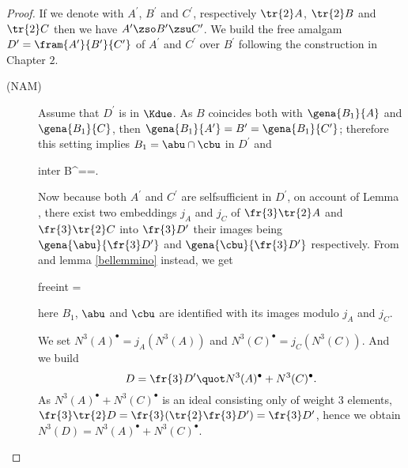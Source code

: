 \begin{proof}
If we denote with $A^{\prime}$, $B^{\prime}$ and $C^{\prime}$, respectively $\tr{2}A$, $\tr{2}B$ and
$\tr{2}C$ then
we have $A^{\prime}\zso B^{\prime}\zsu C^{\prime}$.
We build the free amalgam $D^{\prime}=\fram{A^{\prime}}{B^{\prime}}{C^{\prime}}$ of $A^{\prime}$ and $C^{\prime}$ over $B^{\prime}$ following the construction in Chapter $2$.
\begin{description}
\item[(NAM)]Assume that $D^{\prime}$ is in $\Kdue$.
As $B$ coincides both with $\gena{B_{1}}{A}$ and $\gena{B_{1}}{C}$, then $\gena{B_{1}}{A^{\prime}}=B^{\prime}=
\gena{B_{1}}{C^{\prime}}$;
therefore this setting implies $B_{1}=\abu\cap\cbu$ in $D^{\prime}$ and
\begin{labeq}{inter}
B^{\prime}==\cap{}.
\end{labeq}
Now because both $A^{\prime}$ and $C^{\prime}$ are selfsufficient in $D^{\prime}$,
on account of Lemma ,
there exist two embeddings $j_{A}$ and $j_{C}$ of $\fr{3}\tr{2}A$ and $\fr{3}\tr{2}C$
into $\fr{3}D^{\prime}$ their images being $\gena{\abu}{\fr{3}D^{\prime}}$ and $\gena{\cbu}
{\fr{3}D^{\prime}}$ respectively. From  and lemma \ref{bellemmino} instead, we get
\begin{labeq}{freeint}
=\cap{}
\end{labeq}
here $B_{1}$, $\abu$ and $\cbu$ are identified with its images modulo $j_{A}$ and $j_{C}$. 

We set $N^{3}(A)^{\bullet}=j_{A}(N^{3}(A))$ and $N^{3}(C)^{\bullet}=j_{C}(N^{3}(C))$.
And we build
$$D=\fr{3}D^{\prime}\quot N^{3}(A)^{\bullet}+N^{3}(C)^{\bullet}.$$
As $N^{3}(A)^{\bullet}+N^{3}(C)^{\bullet}$ is an ideal consisting only of weight $3$ elements,
$\fr{3}\tr{2}D=\fr{3}(\tr{2}\fr{3}D^{\prime})%
=\fr{3}D^{\prime}$, hence we obtain $N^{3}(D)=N^{3}(A)^{\bullet}+N^{3}(C)^{\bullet}$.


\end{description}
\end{proof}
